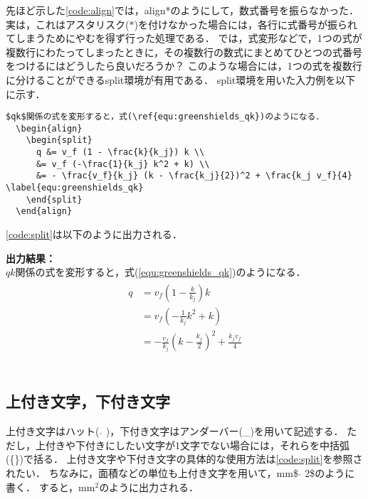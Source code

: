 先ほど示した\code\ref{code:align}では，align*のようにして，数式番号を振らなかった．
実は，これはアスタリスク($\ast$)を付けなかった場合には，各行に式番号が振られてしまうためにやむを得ず行った処理である．
では，式変形などで，1つの式が複数行にわたってしまったときに，その複数行の数式にまとめてひとつの式番号をつけるにはどうしたら良いだろうか？
このような場合には，1つの式を複数行に分けることができるsplit環境が有用である．
split環境を用いた入力例を以下に示す．
\begin{lstlisting}[caption=split環境,label=code:split]
  $qk$関係の式を変形すると，式(\ref{equ:greenshields_qk})のようになる．
  \begin{align}
    \begin{split}
      q &= v_f (1 - \frac{k}{k_j}) k \\
      &= v_f (-\frac{1}{k_j} k^2 + k) \\
      &= - \frac{v_f}{k_j} (k - \frac{k_j}{2})^2 + \frac{k_j v_f}{4}  \label{equ:greenshields_qk}
    \end{split}
  \end{align}
\end{lstlisting}
\code\ref{code:split}は以下のように出力される．

\noindent\textbf{出力結果：}\hrulefill\\
  $qk$関係の式を変形すると，式(\ref{equ:greenshields_qk})のようになる．
  \begin{align}
    \begin{split}
      q &= v_f (1 - \frac{k}{k_j}) k \\
      &= v_f (-\frac{1}{k_j} k^2 + k) \\
      &= - \frac{v_f}{k_j} (k - \frac{k_j}{2})^2 + \frac{k_j v_f}{4}  \label{equ:greenshields_qk}
    \end{split}
  \end{align}
\\\noindent\hrulefill 

\subsection{上付き文字，下付き文字}

上付き文字はハット( $\hat{}$ )，下付き文字はアンダーバー(\_)を用いて記述する．
ただし，上付きや下付きにしたい文字が1文字でない場合には，それらを中括弧(\{\})で括る．
上付き文字や下付き文字の具体的な使用方法は\code\ref{code:split}を参照されたい．
ちなみに，面積などの単位も上付き文字を用いて，mm\$ $\hat{}$ 2\$のように書く．
すると，mm$^2$のように出力される．

